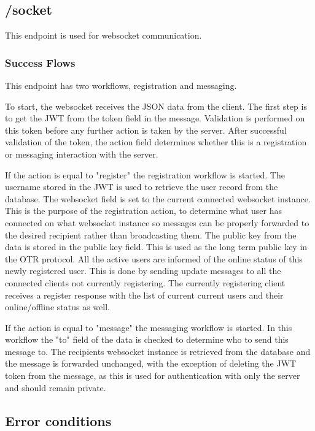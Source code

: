 \subsection{/socket}


This endpoint is used for websocket communication.


\subsubsection{Success Flows}


This endpoint has two workflows, registration and messaging.


To start, the websocket receives the JSON data from the client. The first step is to get the JWT from the token field in the message. Validation is performed on this token before any further action is taken by the server. After successful validation of the token, the action field determines whether this is a registration or messaging interaction with the server.


If the action is equal to "register" the registration workflow is started. The username stored in the JWT is used to retrieve the user record from the database. The websocket field is set to the current connected websocket instance. This is the purpose of the registration action, to determine what user has connected on what websocket instance so messages can be properly forwarded to the desired recipient rather than broadcasting them. The public key from the data is stored in the public key field. This is used as the long term public key in the OTR protocol. All the active users are informed of the online status of this newly registered user. This is done by sending update messages to all the connected clients not currently registering. The currently registering client receives a register response with the list of current current users and their online/offline status as well.


If the action is equal to "message" the messaging workflow is started. In this workflow the "to" field of the data is checked to determine who to send this message to. The recipients websocket instance is retrieved from the database and the message is forwarded unchanged, with the exception of deleting the JWT token from the message, as this is used for authentication with only the server and should remain private.


\subsection{Error conditions}


